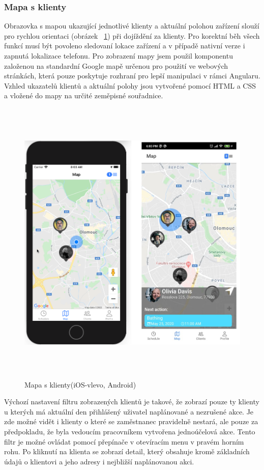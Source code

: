 \documentclass[
  biblatex,
  glossaries,
  index
]{kidiplom}
\begin{document}
\subsubsection{Mapa s klienty}
Obrazovka s mapou ukazující jednotlivé klienty a aktuální polohou zařízení slouží pro rychlou orientaci (obrázek ~\ref{fig:mapClients}) při dojíždění za klienty. Pro korektní běh všech funkcí musí být povoleno sledovaní lokace zařízení a v případě nativní verze i zapnutá lokalizace telefonu. Pro zobrazení mapy jsem použil komponentu založenou na standardní Google mapě určenou pro použití ve webových stránkách, která pouze poskytuje rozhraní pro lepší manipulaci v rámci Angularu. Vzhled ukazatelů klientů a aktuální polohy jsou vytvořené pomocí HTML a CSS a vložené do mapy na určité zeměpisné souřadnice.

\begin{figure}[H]
  	\centering
 	 \includegraphics[width=14cm,height=14cm,keepaspectratio]{map}
 	 \caption{Mapa s klienty(iOS-vlevo, Android)}
 	 \label{fig:mapClients}
\end{figure}

Výchozí nastavení filtru zobrazených klientů je takové, že zobrazí pouze ty klienty u kterých má aktuální den přihlášený uživatel naplánované a nezrušené akce. Je zde možné vidět i klienty o které se zaměstnanec pravidelně nestará, ale pouze za předpokladu, že byla vedoucím pracovníkem vytvořena jednoúčelová akce. Tento filtr je možné ovládat pomocí přepínače v otevíracím menu v pravém horním rohu. Po kliknutí na klienta se zobrazí detail, který obsahuje kromě základních údajů o klientovi a jeho adresy i nejbližší naplánovanou akci. 
\end{document}
